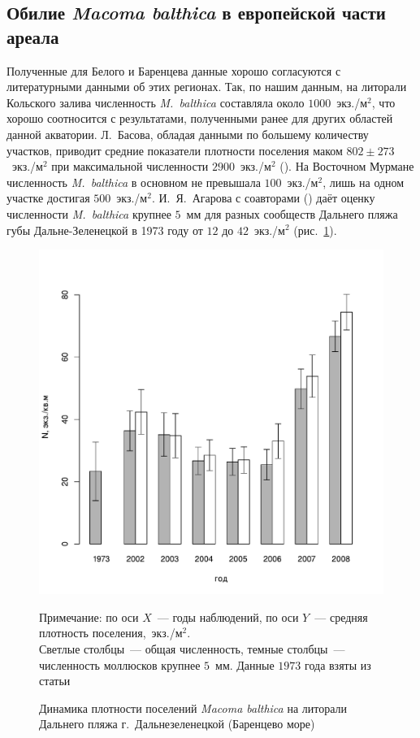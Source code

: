 		\subsection{Обилие {\it Macoma balthica} в европейской части ареала}
Полученные для Белого и Баренцева данные хорошо согласуются с литературными данными об этих регионах.
Так, по нашим данным, на литорали Кольского залива численность {\it M.~balthica} составляла около $1000$~экз./м$^2$, что хорошо соотносится с результатами, полученными ранее для других областей данной акватории. 
Л.~Басова, обладая данными по большему количеству участков, приводит средние показатели плотности поселения маком $802 \pm 273$~экз./м$^2$ при максимальной численности $2900$~экз./м$^2$ (\cite{Basova_2004}).
На Восточном Мурмане численность {\it M.~balthica} в основном не превышала $100$~экз./м$^2$, лишь на одном участке достигая $500$~экз./м$^2$. 
И.~Я.~Агарова с соавторами (\cite{Agarova_et_al_1976}) даёт оценку численности {\it M.~balthica} крупнее $5$~мм для разных сообществ Дальнего пляжа губы Дальне-Зеленецкой в 1973 году от $12$ до $42$~экз./м$^2$ (рис.~\ref{ris:dynamic_Zelency_Agarova}). 
	\begin{figure}[p]
		\includegraphics{../after_Deryuginskie/Macoma_N_dynamic_all1.pdf}
	\caption{Динамика плотности поселений {\it Macoma balthica} на литорали Дальнего пляжа г.~Дальнезеленецкой (Баренцево море)}
{\footnotesize Примечание: по оси $X$~--- годы наблюдений, по оси $Y$~--- средняя плотность поселения,~экз./м$^2$. \\
Светлые столбцы~--- общая численность, темные столбцы~--- численность моллюсков крупнее $5$~мм. Данные $1973$ года взяты из статьи \cite{Agarova_et_al_1976}}
	\label{ris:dynamic_Zelency_Agarova}
	\end{figure}
